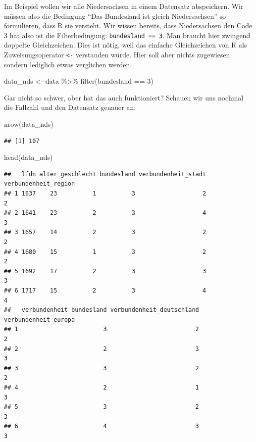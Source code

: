 \documentclass[
]{book}
\newenvironment{Shaded}{\begin{snugshade}}{\end{snugshade}}
\newcommand{\DecValTok}[1]{\textcolor[rgb]{0.00,0.00,0.81}{#1}}
\newcommand{\FunctionTok}[1]{\textcolor[rgb]{0.00,0.00,0.00}{#1}}
\newcommand{\NormalTok}[1]{#1}
\newcommand{\OtherTok}[1]{\textcolor[rgb]{0.56,0.35,0.01}{#1}}
\newcommand{\SpecialCharTok}[1]{\textcolor[rgb]{0.00,0.00,0.00}{#1}}
\begin{document}
Im Beispiel wollen wir alle Niedersachsen in einem Datensatz abspeichern. Wir müssen also die Bedingung ``Das Bundesland ist gleich Niedersachsen'' so formulieren, dass R sie versteht. Wir wissen bereits, dass Niedersachsen den Code 3 hat also ist die Filterbedingung: \texttt{bundesland\ ==\ 3}. Man braucht hier zwingend doppelte Gleichzeichen. Dies ist nötig, weil das einfache Gleichzeichen von R als Zuweisungsoperator \texttt{\textless{}-} verstanden würde. Hier soll aber nichts zugewiesen sondern lediglich etwas verglichen werden.

\begin{Shaded}
\begin{Highlighting}[]
\NormalTok{data\_nds }\OtherTok{\textless{}{-}}\NormalTok{ data }\SpecialCharTok{\%\textgreater{}\%} 
  \FunctionTok{filter}\NormalTok{(bundesland }\SpecialCharTok{==} \DecValTok{3}\NormalTok{)}
\end{Highlighting}
\end{Shaded}

Gar nicht so schwer, aber hat das auch funktioniert? Schauen wir uns nochmal die Fallzahl und den Datensatz genauer an:

\begin{Shaded}
\begin{Highlighting}[]
\FunctionTok{nrow}\NormalTok{(data\_nds)}
\end{Highlighting}
\end{Shaded}

\begin{verbatim}
## [1] 107
\end{verbatim}

\begin{Shaded}
\begin{Highlighting}[]
\FunctionTok{head}\NormalTok{(data\_nds)}
\end{Highlighting}
\end{Shaded}

\begin{verbatim}
##   lfdn alter geschlecht bundesland verbundenheit_stadt verbundenheit_region
## 1 1637    23          1          3                   2                    2
## 2 1641    23          2          3                   4                    3
## 3 1657    14          2          3                   2                    2
## 4 1680    15          1          3                   2                    2
## 5 1692    17          2          3                   3                    3
## 6 1717    15          2          3                   4                    4
##   verbundenheit_bundesland verbundenheit_deutschland verbundenheit_europa
## 1                        3                         2                    2
## 2                        2                         3                    3
## 3                        3                         2                    2
## 4                        2                         1                    3
## 5                        3                         2                    3
## 6                        4                         3                    3
\end{verbatim}
\end{document}
